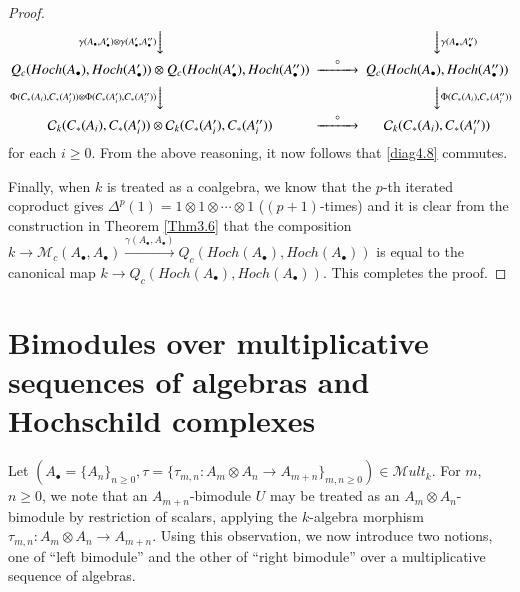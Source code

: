 \documentclass[10pt, colorlinks]{article}
\numberwithin{equation}{section} \DeclareMathSizes{2}{10}{12}{13}
\begin{document}
\begin{proof}
\begin{equation}
\begin{CD}
@V\gamma(A_\bullet,A_\bullet')\otimes \gamma(A_\bullet',A_\bullet'')VV @VV\gamma(A_\bullet,A_\bullet'')V\\
Q_c(Hoch(A_\bullet), Hoch(A_\bullet'))\otimes Q_c(Hoch(A_\bullet'), Hoch(A_\bullet'')) @>\circ>>  Q_c(Hoch(A_\bullet), Hoch(A_\bullet''))\\ 
@V \Phi(C_*(A_i),C_*(A_i'))\otimes  \Phi(C_*(A_i'),C_*(A_i''))VV @VV \Phi(C_*(A_i),C_*(A_i''))V \\
 \mathcal C_k(C_*(A_i),C_*(A_i'))\otimes  \mathcal C_k(C_*(A'_i),C_*(A_i''))@>\circ>> \mathcal C_k(C_*(A_i),C_*(A_i''))\\
\end{CD}
\end{equation} for each $i\geq 0$. From the above reasoning, it now follows that \eqref{diag4.8} commutes. 

\smallskip
 Finally, when $k$ is treated as a coalgebra, we know that the $p$-th iterated coproduct gives $\Delta^p(1)={1\otimes 1\otimes \cdots \otimes 1}$ 
($(p+1)$-times) and it is clear from the construction in Theorem \ref{Thm3.6} that the composition $k\longrightarrow\mathcal M_c(A_\bullet,A_\bullet)\xrightarrow{\gamma(A_\bullet,A_\bullet)}Q_c(Hoch(A_\bullet),Hoch(A_\bullet))$ is equal to the canonical map $k\longrightarrow Q_c(Hoch(A_\bullet),Hoch(A_\bullet))$. This completes the proof.
    \end{proof}

  
   
   
\section{Bimodules over multiplicative sequences of algebras and Hochschild complexes}


Let $\left(A_\bullet=\{A_n\}_{n\geq 0},\tau=\{\tau_{m,n}:A_m\otimes A_n\longrightarrow A_{m+n}\}_{m,n\geq 0}\right)\in \mathscr Mult_k$. For  $m$, $n\geq 0$, we note that an $A_{m+n}$-bimodule $U$  may be treated as an $A_m\otimes A_n$-bimodule by restriction of scalars, applying the $k$-algebra morphism $\tau_{m,n}:A_m\otimes A_n\longrightarrow A_{m+n}$. 
Using this observation, we now introduce two notions, one of ``left bimodule'' and the other of ``right bimodule'' over a multiplicative sequence of algebras. 
      
\end{document}
